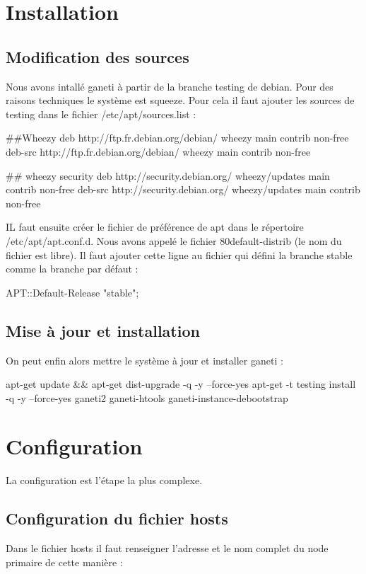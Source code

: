 \section {Installation}
\subsection {Modification des sources}
Nous avons intallé ganeti à partir de la branche testing de debian. Pour des raisons techniques le système est squeeze. Pour cela il faut ajouter les sources de testing dans le fichier /etc/apt/sources.list :

##Wheezy
deb http://ftp.fr.debian.org/debian/ wheezy main contrib non-free
deb-src http://ftp.fr.debian.org/debian/ wheezy main contrib non-free

## wheezy security
deb http://security.debian.org/ wheezy/updates main contrib non-free
deb-src http://security.debian.org/ wheezy/updates main contrib non-free


IL faut ensuite créer le fichier de préférence de apt dans le répertoire /etc/apt/apt.conf.d. Nous avons appelé le  fichier 80default-distrib (le nom du fichier est libre). Il faut ajouter cette ligne au fichier qui défini la branche stable comme la branche par défaut :

APT::Default-Release "stable";

\subsection {Mise à jour et installation}
On peut enfin alors mettre le système à jour et installer ganeti :

apt-get update && apt-get dist-upgrade -q -y --force-yes
apt-get -t testing install -q -y --force-yes ganeti2 ganeti-htools ganeti-instance-debootstrap

\section {Configuration}

La configuration est l'étape la plus complexe.

\subsection {Configuration du fichier hosts}

Dans le fichier hosts il faut renseigner l'adresse et le nom complet du node primaire de cette manière :

